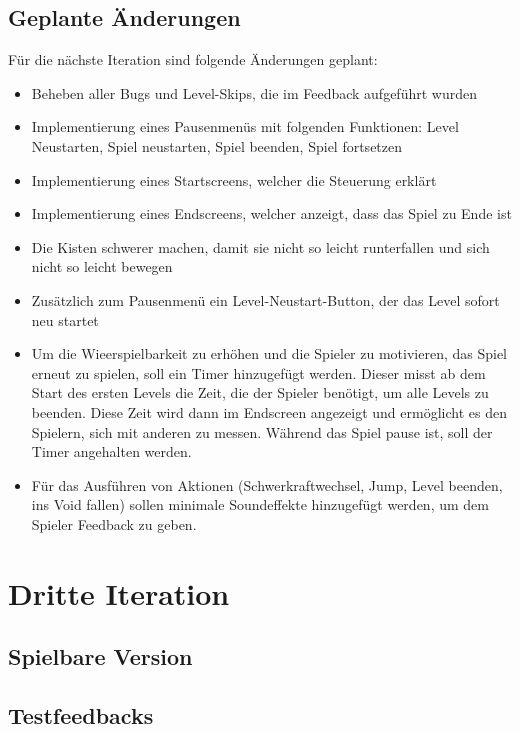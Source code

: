 \documentclass{article}
\begin{document}
\subsection{Geplante Änderungen}

Für die nächste Iteration sind folgende Änderungen geplant:

\begin{itemize}
    \item Beheben aller Bugs und Level-Skips, die im Feedback aufgeführt wurden
    \item Implementierung eines Pausenmenüs mit folgenden Funktionen: Level Neustarten, Spiel neustarten, Spiel beenden, Spiel fortsetzen
    \item Implementierung eines Startscreens, welcher die Steuerung erklärt
    \item Implementierung eines Endscreens, welcher anzeigt, dass das Spiel zu Ende ist
    \item Die Kisten schwerer machen, damit sie nicht so leicht runterfallen und sich nicht so leicht bewegen
    \item Zusätzlich zum Pausenmenü ein Level-Neustart-Button, der das Level sofort neu startet
    \item Um die Wieerspielbarkeit zu erhöhen und die Spieler zu motivieren, das Spiel erneut zu spielen, soll ein Timer hinzugefügt werden. Dieser misst ab dem Start des ersten Levels
    die Zeit, die der Spieler benötigt, um alle Levels zu beenden. Diese Zeit wird dann im Endscreen angezeigt und ermöglicht es den Spielern, sich mit anderen zu messen. Während das Spiel
    pause ist, soll der Timer angehalten werden.
    \item Für das Ausführen von Aktionen (Schwerkraftwechsel, Jump, Level beenden, ins Void fallen) sollen minimale Soundeffekte hinzugefügt werden, um dem Spieler Feedback zu geben.
\end{itemize}

\newpage

\section{Dritte Iteration}

\subsection{Spielbare Version}

\subsection{Testfeedbacks}
\end{document}
